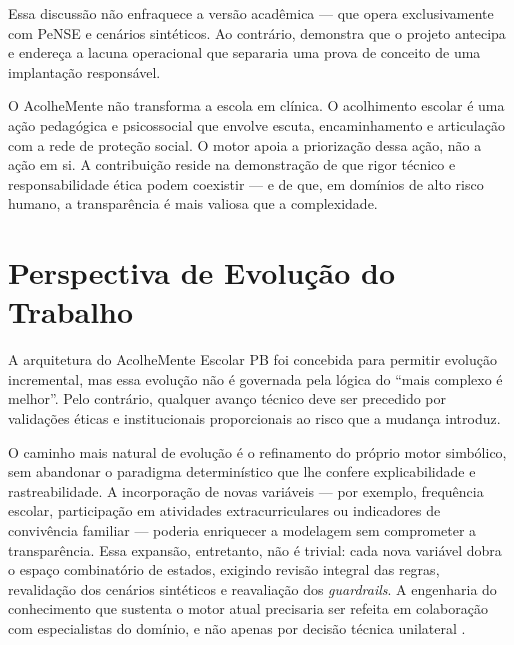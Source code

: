 \documentclass[
    12pt,
    openright,
    oneside,
    a4paper,
    english,
    brazil
]{abntex2}
\begin{document}
Essa discuss\~ao n\~ao enfraquece a vers\~ao acad\^emica --- que opera exclusivamente com PeNSE e cen\'arios sint\'eticos. Ao contr\'ario, demonstra que o projeto antecipa e endere\c{c}a a lacuna operacional que separaria uma prova de conceito de uma implanta\c{c}\~ao respons\'avel.

O AcolheMente n\~ao transforma a escola em cl\'inica. O acolhimento escolar \'e uma a\c{c}\~ao pedag\'ogica e psicossocial que envolve escuta, encaminhamento e articula\c{c}\~ao com a rede de prote\c{c}\~ao social. O motor apoia a prioriza\c{c}\~ao dessa a\c{c}\~ao, n\~ao a a\c{c}\~ao em si. A contribui\c{c}\~ao reside na demonstra\c{c}\~ao de que rigor t\'ecnico e responsabilidade \'etica podem coexistir --- e de que, em dom\'inios de alto risco humano, a transpar\^encia \'e mais valiosa que a complexidade.

\chapter{Perspectiva de Evolu\c{c}\~ao do Trabalho}

A arquitetura do AcolheMente Escolar PB foi concebida para permitir evolu\c{c}\~ao incremental, mas essa evolu\c{c}\~ao n\~ao \'e governada pela l\'ogica do ``mais complexo \'e melhor''. Pelo contr\'ario, qualquer avan\c{c}o t\'ecnico deve ser precedido por valida\c{c}\~oes \'eticas e institucionais proporcionais ao risco que a mudan\c{c}a introduz.

O caminho mais natural de evolu\c{c}\~ao \'e o refinamento do pr\'oprio motor simb\'olico, sem abandonar o paradigma determin\'istico que lhe confere explicabilidade e rastreabilidade. A incorpora\c{c}\~ao de novas vari\'aveis --- por exemplo, frequ\^encia escolar, participa\c{c}\~ao em atividades extracurriculares ou indicadores de conviv\^encia familiar --- poderia enriquecer a modelagem sem comprometer a transpar\^encia. Essa expans\~ao, entretanto, n\~ao \'e trivial: cada nova vari\'avel dobra o espa\c{c}o combinat\'orio de estados, exigindo revis\~ao integral das regras, revalida\c{c}\~ao dos cen\'arios sint\'eticos e reavalia\c{c}\~ao dos \textit{guardrails}. A engenharia do conhecimento que sustenta o motor atual precisaria ser refeita em colabora\c{c}\~ao com especialistas do dom\'inio, e n\~ao apenas por decis\~ao t\'ecnica unilateral \cite{russell_norvig_2022}.
\end{document}
